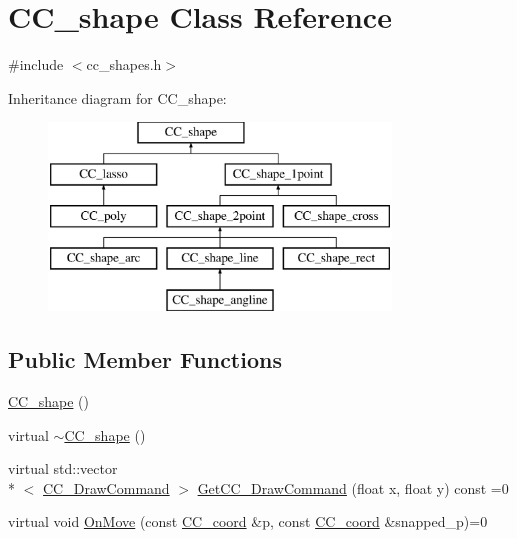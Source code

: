 \hypertarget{a00037}{\section{C\-C\-\_\-shape Class Reference}
\label{a00037}
}


{\ttfamily \#include $<$cc\-\_\-shapes.\-h$>$}

Inheritance diagram for C\-C\-\_\-shape\-:\begin{figure}[H]
\begin{center}
\leavevmode
\includegraphics[height=5.000000cm]{a00037}
\end{center}
\end{figure}
\subsection*{Public Member Functions}
\begin{DoxyCompactItemize}
\item 
\hyperlink{a00037_a82a3842182b43479636e07051c01dc92}{C\-C\-\_\-shape} ()
\item 
virtual \hyperlink{a00037_a77face5d8bd1307231fe0b9bca2bd2d6}{$\sim$\-C\-C\-\_\-shape} ()
\item 
virtual std\-::vector\\*
$<$ \hyperlink{a00031}{C\-C\-\_\-\-Draw\-Command} $>$ \hyperlink{a00037_aec026dc3fefc83bd03031e17307d073c}{Get\-C\-C\-\_\-\-Draw\-Command} (float x, float y) const =0
\item 
virtual void \hyperlink{a00037_a323c027fc21841c560b5759573b50f56}{On\-Move} (const \hyperlink{a00029}{C\-C\-\_\-coord} \&p, const \hyperlink{a00029}{C\-C\-\_\-coord} \&snapped\-\_\-p)=0
\end{DoxyCompactItemize}


